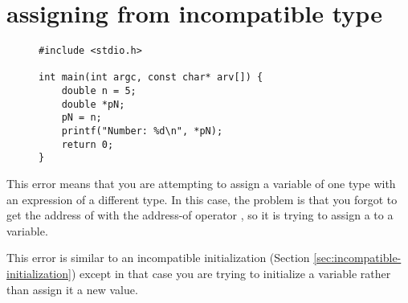 \section{assigning from incompatible type}\label{sec:incompatible-assignment}

\begin{figure}
\begin{lstlisting}
#include <stdio.h>

int main(int argc, const char* arv[]) {
	double n = 5;
	double *pN;
	pN = n;
	printf("Number: %d\n", *pN);
	return 0;
}
\end{lstlisting}
\label{ex:incompatible-assignment}
\end{figure}

This error means that you are attempting to assign a variable of one type with an expression of a different type.
In this case, the problem is that you forgot to get the address of  with the address-of operator \code{\&}, so it is trying to assign a  to a  variable.

This error is similar to an incompatible initialization (Section \ref{sec:incompatible-initialization}) except in that case you are trying to initialize a variable rather than assign it a new value.

\newpage